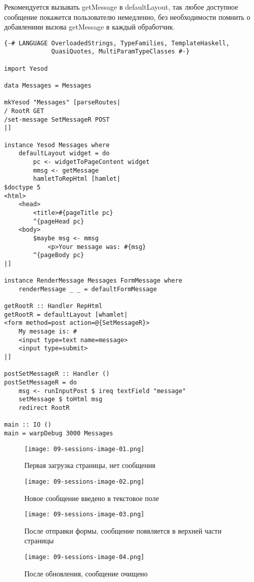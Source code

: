 Рекомендуется вызывать getMessage в defaultLayout, так любое доступное сообщение покажется пользователю немедленно, без необходимости помнить о добавлениии вызова getMessage в каждый обработчик. 

\begin{lstlisting}
{-# LANGUAGE OverloadedStrings, TypeFamilies, TemplateHaskell,
             QuasiQuotes, MultiParamTypeClasses #-}

import Yesod

data Messages = Messages

mkYesod "Messages" [parseRoutes|
/ RootR GET
/set-message SetMessageR POST
|]

instance Yesod Messages where
    defaultLayout widget = do
        pc <- widgetToPageContent widget
        mmsg <- getMessage
        hamletToRepHtml [hamlet|
$doctype 5
<html>
    <head>
        <title>#{pageTitle pc}
        ^{pageHead pc}
    <body>
        $maybe msg <- mmsg
            <p>Your message was: #{msg}
        ^{pageBody pc}
|]

instance RenderMessage Messages FormMessage where
    renderMessage _ _ = defaultFormMessage

getRootR :: Handler RepHtml
getRootR = defaultLayout [whamlet|
<form method=post action=@{SetMessageR}>
    My message is: #
    <input type=text name=message>
    <input type=submit>
|]

postSetMessageR :: Handler ()
postSetMessageR = do
    msg <- runInputPost $ ireq textField "message"
    setMessage $ toHtml msg
    redirect RootR

main :: IO ()
main = warpDebug 3000 Messages
\end{lstlisting}

\begin{figure}[tbh]
  \centering
  \texttt{[image: 09-sessions-image-01.png]}
  \caption{Первая загрузка страницы, нет сообщения}
\end{figure}

\begin{figure}[tbh]
  \centering
  \texttt{[image: 09-sessions-image-02.png]}
  \caption{Новое сообщение введено в текстовое поле}
\end{figure}

\begin{figure}[tbh]
  \centering
  \caption{После отправки формы, сообщение появляется в верхней части страницы}
  \texttt{[image: 09-sessions-image-03.png]}
\end{figure}

\begin{figure}[tbh]
  \centering
  \caption{После обновления, сообщение очищено}
  \texttt{[image: 09-sessions-image-04.png]}
\end{figure}

